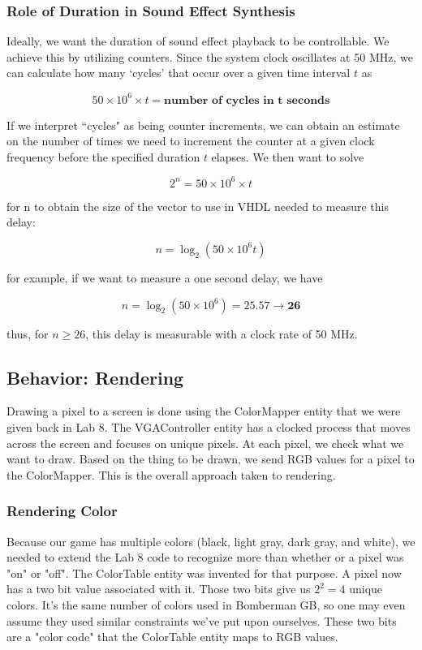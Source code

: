 \documentclass[10pt,a4paper]{article}
\begin{document}
\subsubsection{Role of Duration in Sound Effect Synthesis}
Ideally, we want the duration of sound effect playback to be controllable. We achieve this by utilizing counters. Since the system clock oscillates at 50 MHz, we can calculate how many `cycles' that occur over a given time interval $t$ as

\[ 50 \times 10^{6} \times t = \textbf{number of cycles in t seconds} \]

If we interpret ``cycles" as being counter increments, we can obtain an estimate on the number of times we need to increment the counter at a given clock frequency before the specified duration $t$ elapses. We then want to solve

\[ 2^{n} = 50 \times 10^{6} \times t \]

for n to obtain the size of the vector to use in VHDL needed to measure this delay:

\[ n = \log_2 \left( 50 \times 10^{6}t \right)\]

for example, if we want to measure a one second delay, we have

\[ n = \log_2(50 \times 10^6) = 25.57 \rightarrow \mathbf{26} \]

thus, for $n \ge 26$, this delay is measurable with a clock rate of 50 MHz.

\subsection{Behavior: Rendering}
Drawing a pixel to a screen is done using the ColorMapper entity that we were given back in Lab 8. The VGAController entity has a clocked process that moves across the screen and focuses on unique pixels. At each pixel, we check what we want to draw. Based on the thing to be drawn, we send RGB values for a pixel to the ColorMapper. This is the overall approach taken to rendering.

\subsubsection{Rendering Color}
Because our game has multiple colors (black, light gray, dark gray, and white), we needed to extend the Lab 8 code to recognize more than whether or a pixel was "on" or "off". The ColorTable entity was invented for that purpose. A pixel now has a two bit value associated with it. Those two bits give us $ 2^2 = 4 $ unique colors. It's the same number of colors used in Bomberman GB, so one may even assume they used similar constraints we've put upon ourselves. These two bits are a "color code" that the ColorTable entity maps to RGB values.
\end{document}
